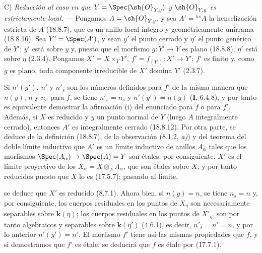 C) \emph{Reducción al caso en que $Y=\Spec(\sh{O}_{Y,y})$ y $\sh{O}_{Y,y}$ es estrictamente local.} --- Pongamos $A=\sh{O}_{Y,y}$, y sea $A'={}^{hs}\!A$ la henselización estricta de $A$ (18.8.7), que es un anillo local íntegro y geométricamente unirrama (18.8.16). Sea $Y'=\Spec(A')$, y sean $y'$ el punto cerrado y $\eta'$ el punto genérico de $Y'$; $y'$ está sobre $y$ y, puesto que el morfismo $g:Y'\to Y$ es plano (18.8.8), $\eta'$ está sobre $\eta$ (2.3.4). Pongamos $X'=X\times_Y Y'$, $f'=f_{(Y')}:X'\to Y'$; $f'$ es finito y, como $g$ es plano, toda componente irreducible de $X'$ domina $Y'$ (2.3.7).

Si $n'(y')$, $n'$ y $n'_s$ son los números definidos para $f'$ de la misma manera que $n(y)$, $n$ y $n_s$ para $f$, se tiene $n'_s=n_s$ y $n'(y')=n(y)$ (\textbf I, 6.4.8), y por tanto es equivalente demostrar la afirmación (i) del enunciado para $f$ o para $f'$. Además, si $X$ es reducido y $y$ un punto normal de $Y$ (luego $A$ integralmente cerrado), entonces $A'$ es integralmente cerrado (18.8.12). Por otra parte, se deduce de la definición (18.8.7), de la observación (8.1.2, \emph{a)}) y del teorema del doble límite inductivo que $A'$ es un límite inductivo de anillos $A_\alpha$ tales que los morfismos $\Spec(A_\alpha)\to\Spec(A)=Y$ son étales; por consiguiente, $X'$ es el límite proyectivo de los $X_\alpha=X\otimes_A A_\alpha$, que son étales sobre $X$, y por tanto reducidos puesto que $X$ lo es (17.5.7); pasando al límite,


se deduce que $X'$ es reducido (8.7.1). Ahora bien, si $n(y)=n$, se tiene $n_s=n$ y, por consiguiente, los cuerpos residuales en los puntos de $X_\eta$ son necesariamente separables sobre $\boldsymbol k(\eta)$; los cuerpos residuales en los puntos de $X'_{\eta'}$ son por tanto algebraicos y separables sobre $\boldsymbol k(\eta')$ (4.6.1), es decir, $n'_s=n'=n$, y por lo anterior $n'(y')=n'$. El morfismo $f'$ tiene así las mismas propiedades que $f$, y si demostramos que $f'$ es étale, se deducirá que $f$ es étale por (17.7.1).

